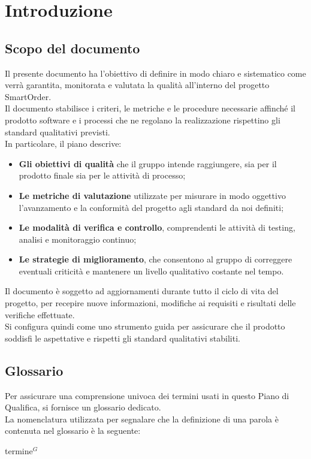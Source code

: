 \section{Introduzione}
	\subsection{Scopo del documento}
	Il presente documento ha l’obiettivo di definire in modo chiaro e sistematico come verrà garantita, monitorata e valutata la qualità all’interno del progetto SmartOrder.\\
	Il documento stabilisce i criteri, le metriche e le procedure necessarie affinché il prodotto software e i processi che ne regolano la realizzazione rispettino gli standard qualitativi previsti.\\
	In particolare, il piano descrive:
	\begin{itemize}[itemsep=0pt, parsep=1pt, label=$\scriptstyle\bullet$]
        \item \textbf{Gli obiettivi di qualità} che il gruppo intende raggiungere, sia per il prodotto finale sia per le attività di processo;
        \item \textbf{Le metriche di valutazione} utilizzate per misurare in modo oggettivo l’avanzamento e la conformità del progetto agli standard da noi definiti;
        \item \textbf{Le modalità di verifica e controllo}, comprendenti le attività di testing, analisi e monitoraggio continuo;
        \item \textbf{Le strategie di miglioramento}, che consentono al gruppo di correggere eventuali criticità e mantenere un livello qualitativo costante nel tempo.
    \end{itemize}
	Il documento è soggetto ad aggiornamenti durante tutto il ciclo di vita del progetto, per recepire nuove informazioni, modifiche ai requisiti e risultati delle verifiche effettuate.\\
	Si configura quindi come uno strumento guida per assicurare che il prodotto soddisfi le aspettative e rispetti gli standard qualitativi stabiliti.

	\subsection{Glossario}
    Per assicurare una comprensione univoca dei termini usati in questo Piano di Qualifica, si fornisce un glossario dedicato.\\
	La nomenclatura utilizzata per segnalare che la definizione di una parola è contenuta nel glossario è la seguente: 
    \begin{center}
        termine$^{G}$
    \end{center}

